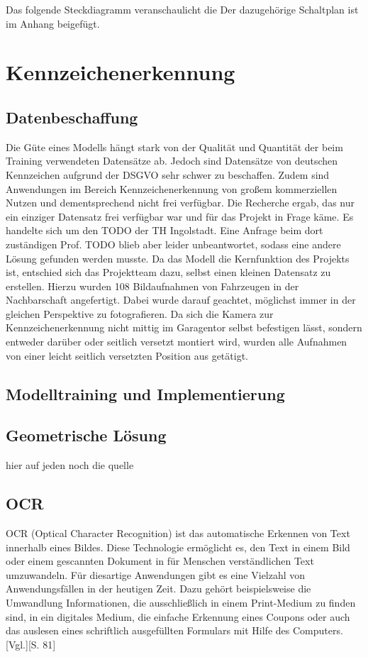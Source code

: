 Das folgende Steckdiagramm veranschaulicht die 
Der dazugehörige Schaltplan ist im Anhang beigefügt.

\nocite{*}

\chapter{Kennzeichenerkennung}

\section{Datenbeschaffung}
Die Güte eines Modells hängt stark von der Qualität und Quantität der beim Training verwendeten Datensätze ab. Jedoch sind Datensätze von deutschen Kennzeichen aufgrund der \ac{DSGVO} sehr schwer zu beschaffen. Zudem sind Anwendungen im Bereich Kennzeichenerkennung von großem kommerziellen Nutzen und dementsprechend nicht frei verfügbar. Die Recherche ergab, das nur ein einziger Datensatz frei verfügbar war und für das Projekt in Frage käme. Es handelte sich um den TODO der TH Ingolstadt. Eine Anfrage beim dort zuständigen Prof. TODO blieb aber leider unbeantwortet, sodass eine andere Lösung gefunden werden musste.
Da das Modell die Kernfunktion des Projekts ist, entschied sich das Projektteam dazu, selbst einen kleinen Datensatz zu erstellen. 
Hierzu wurden 108 Bildaufnahmen von Fahrzeugen in der Nachbarschaft angefertigt. Dabei wurde darauf geachtet, möglichst immer in der gleichen Perspektive zu fotografieren. Da sich die Kamera zur Kennzeichenerkennung nicht mittig im Garagentor selbst befestigen lässt, sondern entweder darüber oder seitlich versetzt montiert wird, wurden alle Aufnahmen von einer leicht seitlich versetzten Position aus getätigt.

\section{Modelltraining und Implementierung}

\section{Geometrische Lösung}
hier auf jeden noch die quelle 

\section{OCR}
OCR (Optical Character Recognition) ist das automatische Erkennen von Text innerhalb eines Bildes. Diese Technologie ermöglicht es, den Text in einem Bild oder einem gescannten Dokument in für Menschen verständlichen Text umzuwandeln. Für diesartige Anwendungen gibt es eine Vielzahl von Anwendungsfällen in der heutigen Zeit. Dazu gehört beispielsweise die Umwandlung Informationen, die ausschließlich in einem Print-Medium zu finden sind, in ein digitales Medium, die einfache Erkennung eines Coupons oder auch das auslesen eines schriftlich ausgefüllten Formulars mit Hilfe des Computers.\autocite{ocr1}[Vgl.][S. 81]

